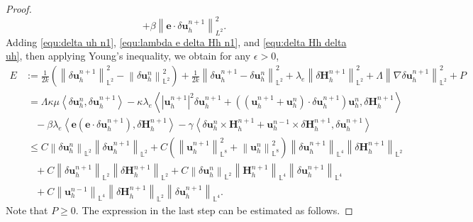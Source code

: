 \documentclass[11pt, reqno]{amsart}
\theoremstyle{definition}
\theoremstyle{remark}
\numberwithin{equation}{section}
\newcommand{\bff}{\boldsymbol}
\newcommand{\bb}{\mathbb}
\newcommand{\norm}[2]{\left\|{#1}\right\|_{#2}}
\newcommand{\inpro}[2]{\left\langle#1,#2\right\rangle}
\newcommand{\abs}[1]{\left|{#1}\right|}
\begin{document}
\begin{proof}
\[+ \beta\norm{\bff{e}\cdot \delta\bff{u}_h^{n+1}}{L^2}^2.
\]
Adding \eqref{equ:delta uh n1}, \eqref{equ:lambda e delta Hh n1}, and \eqref{equ:delta Hh delta uh}, then applying Young's inequality, we obtain for any $\epsilon >0$,
\begin{align*}
	E&:= \frac{1}{2k} \left(\norm{\delta \bff{u}_h^{n+1}}{\bb{L}^2}^2 - \norm{\delta \bff{u}_h^n}{\bb{L}^2}^2\right)
	+
	\frac{1}{2k} \norm{\delta \bff{u}_h^{n+1}-\delta \bff{u}_h^n}{\bb{L}^2}^2
	+
	\lambda_e \norm{\delta \bff{H}_h^{n+1}}{\bb{L}^2}^2
	+
	\Lambda \norm{\nabla \delta \bff{u}_h^{n+1}}{\bb{L}^2}^2
	+
	P
	\\
	&\;=
	\Lambda \kappa \mu \inpro{\delta \bff{u}_h^n}{\delta \bff{u}_h^{n+1}}
	-
	\kappa \lambda_e \inpro{\abs{\bff{u}_h^{n+1}}^2 \delta \bff{u}_h^{n+1} + \left( (\bff{u}_h^{n+1}+\bff{u}_h^n)\cdot \delta \bff{u}_h^{n+1}\right) \bff{u}_h^n}{\delta \bff{H}_h^{n+1}}
	\\
	&\quad
	-
	\beta\lambda_e \inpro{\bff{e}(\bff{e}\cdot \delta\bff{u}_h^{n+1})}{\delta\bff{H}_h^{n+1}}
	-
	\gamma \inpro{\delta \bff{u}_h^n\times \bff{H}_h^{n+1} + \bff{u}_h^{n-1} \times \delta \bff{H}_h^{n+1}}{\delta \bff{u}_h^{n+1}}
	\\
	&\;\leq
	C \norm{\delta \bff{u}_h^n}{\bb{L}^2} \norm{\delta \bff{u}_h^{n+1}}{\bb{L}^2}
	+
	C \left(\norm{\bff{u}_h^{n+1}}{\bb{L}^8}^2 + \norm{\bff{u}_h^n}{\bb{L}^8}^2\right) \norm{\delta \bff{u}_h^{n+1}}{\bb{L}^4} \norm{\delta \bff{H}_h^{n+1}}{\bb{L}^2}
	\\
	&\quad
	+
	C \norm{\delta \bff{u}_h^{n+1}}{\bb{L}^2} \norm{\delta \bff{H}_h^{n+1}}{\bb{L}^2}
	+
	C \norm{\delta \bff{u}_h^n}{\bb{L}^2} \norm{\bff{H}_h^{n+1}}{\bb{L}^4} \norm{\delta \bff{u}_h^{n+1}}{\bb{L}^4}
	\\
	&\quad
	+
	C \norm{\bff{u}_h^{n-1}}{\bb{L}^4} \norm{\delta \bff{H}_h^{n+1}}{\bb{L}^2} \norm{\delta \bff{u}_h^{n+1}}{\bb{L}^4}.
\end{align*}
Note that $P\geq 0$. The expression in the last step can be estimated as follows.


\end{proof}
\end{document}
